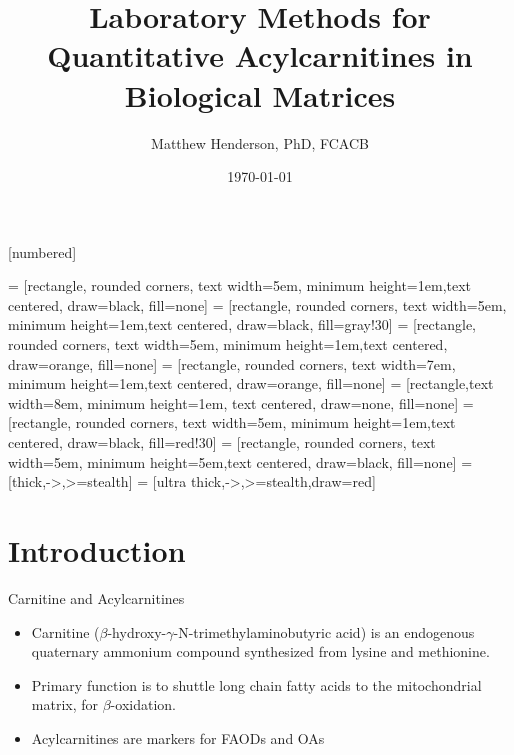 \documentclass[presentation, smaller]{beamer}
\author{Matthew Henderson, PhD, FCACB}
\date{\today}
\title{Laboratory Methods for Quantitative Acylcarnitines in Biological Matrices}
\institute[NSO]{Newborn Screening Ontario | The University of Ottawa}
\begin{document}
\maketitle

\vspace{220pt}
\beamertemplatenavigationsymbolsempty
{}[numbered]

 = [rectangle, rounded corners, text width=5em, minimum height=1em,text centered, draw=black, fill=none]
 = [rectangle, rounded corners, text width=5em, minimum height=1em,text centered, draw=black, fill=gray!30]
 = [rectangle, rounded corners, text width=5em, minimum height=1em,text centered, draw=orange, fill=none]
 = [rectangle, rounded corners, text width=7em, minimum height=1em,text centered, draw=orange, fill=none]
 = [rectangle,text width=8em, minimum height=1em, text centered, draw=none, fill=none]
 = [rectangle, rounded corners, text width=5em, minimum height=1em,text centered, draw=black, fill=red!30]
 = [rectangle, rounded corners, text width=5em, minimum height=5em,text centered, draw=black, fill=none]
 = [thick,->,>=stealth]
 = [ultra thick,->,>=stealth,draw=red]

\section{Introduction}
\label{sec:orgheadline7}
\begin{frame}[label={sec:orgheadline1}]{Carnitine and Acylcarnitines}
\begin{itemize}
\item Carnitine (\(\beta\)-hydroxy-\(\gamma\)-N-trimethylaminobutyric acid) is
an endogenous quaternary ammonium compound synthesized from lysine
and methionine.

\item Primary function is to shuttle long chain fatty acids to the
mitochondrial matrix, for \(\beta\)-oxidation.
\item Acylcarnitines are markers for FAODs and OAs
\end{itemize}
\vspace{2em}
\centering
{}
\hspace{3em}
\end{frame}
\end{document}
